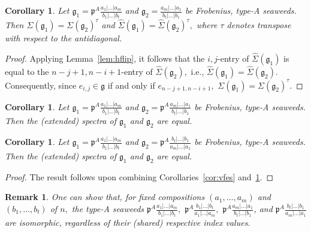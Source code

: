 \documentclass[letterpaper,10pt]{article}
\newtheorem{corollary}[theorem]{Corollary}
\newtheorem{remark}[theorem]{Remark}
\begin{document}
\begin{corollary}
Let $\mathfrak{g}_1=\mathfrak{p}^A\frac{a_1|\dots|a_m}{b_1|\dots|b_t}$ and $\mathfrak{g}_2=\frac{a_m|\dots|a_1}{b_t|\dots|b_1}$ be Frobenius, type-A seaweeds. Then $\Sigma(\mathfrak{g}_1)=\Sigma(\mathfrak{g}_2)^{\tau}$ and $\widehat{\Sigma}(\mathfrak{g}_1)=\widehat{\Sigma}(\mathfrak{g}_2)^{\tau},$ where $\tau$ denotes transpose with respect to the antidiagonal.
\end{corollary}
\begin{proof}
Applying Lemma~\ref{lem:hflip}, it follows that the $i,j$-entry of $\widehat{\Sigma}(\mathfrak{g}_1)$ is equal to the $n-j+1,n-i+1$-entry of $\widehat{\Sigma}(\mathfrak{g}_2),$ i.e., $\widehat{\Sigma}(\mathfrak{g}_1)=\widehat{\Sigma}(\mathfrak{g}_2).$ Consequently, since $e_{i,j}\in\mathfrak{g}$ if and only if $e_{n-j+1,n-i+1},$ $\Sigma(\mathfrak{g}_1)=\Sigma(\mathfrak{g}_2)^{\tau}.$
\end{proof}

\begin{corollary}\label{cor:hfes}
Let $\mathfrak{g}_1=\mathfrak{p}^A\frac{a_1|\hdots|a_m}{b_1|\hdots|b_t}$ and $\mathfrak{g}_2=\mathfrak{p}^A\frac{a_m|\hdots|a_1}{b_t|\hdots|b_1}$ be Frobenius, type-A seaweeds. Then the \textup(extended\textup) spectra of $\mathfrak{g}_1$ and $\mathfrak{g}_2$ are equal.
\end{corollary}


\begin{corollary}\label{cor:vhfes}
Let $\mathfrak{g}_1=\mathfrak{p}^A\frac{a_1|\hdots|a_m}{b_1|\hdots|b_t}$ and $\mathfrak{g}_2=\mathfrak{p}^A\frac{b_t|\hdots|b_1}{a_m|\hdots|a_1}$ be Frobenius, type-A seaweeds. Then the \textup(extended\textup) spectra of $\mathfrak{g}_1$ and $\mathfrak{g}_2$ are equal.
\end{corollary}
\begin{proof}
The result follows upon combining Corollaries~\ref{cor:vfes} and~\ref{cor:hfes}.
\end{proof}


\begin{remark}
One can show that, for fixed compositions $(a_1,\dots,a_m)$ and $(b_1,\dots,b_t)$ of $n,$ the type-A seaweeds $\mathfrak{p}^A\frac{a_1|\dots|a_m}{b_1|\dots|b_t},$ $\mathfrak{p}^A\frac{b_1|\dots|b_t}{a_1|\dots|a_m},$ $\mathfrak{p}^A\frac{a_m|\dots|a_1}{b_t|\dots|b_1}$, and $\mathfrak{p}^A\frac{b_t|\dots|b_1}{a_m|\dots|a_1}$ are isomorphic, regardless of their \textup(shared\textup) respective index values.
\end{remark}
\end{document}
